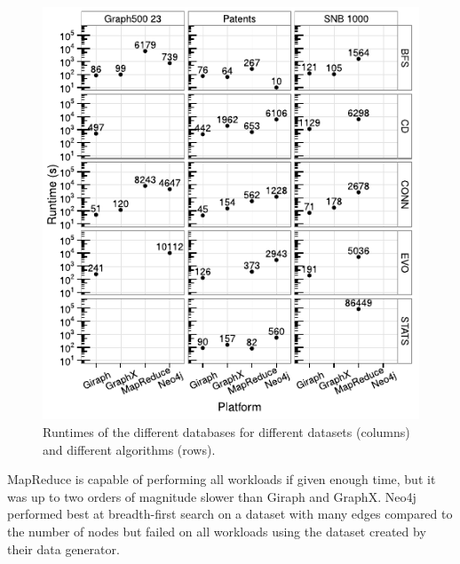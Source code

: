 \begin{figure}[h!]
  \centering
  \includegraphics[width=.75\textwidth]{images/benchmarks/GraphalyticsResults}
  \caption{Runtimes of the different databases for different datasets (columns) and different algorithms (rows).~\cite{Capota2015}}
  \label{fig:graphalyticsResults}
\end{figure}

MapReduce is capable of performing all workloads if given enough time,
but it was up to two orders of magnitude slower than Giraph and GraphX.
Neo4j performed best at breadth-first search on a dataset with many edges compared to the number of nodes but failed on all workloads using the dataset created by their data generator.
